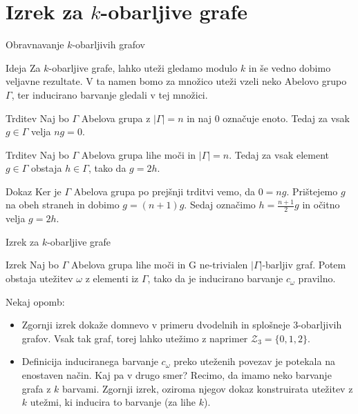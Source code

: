 \documentclass{beamer}
\begin{document}
\section{Izrek za $k$-obarljive grafe}
\begin{frame}{Obravnavanje $k$-obarljivih grafov}
	\begin{block}{Ideja}
		Za $k$-obarljive grafe, lahko uteži gledamo modulo $k$ in še vedno dobimo veljavne rezultate. V ta namen bomo za množico uteži vzeli neko Abelovo grupo $\Gamma$, ter inducirano barvanje gledali v tej množici.
	\end{block} \pause

	\begin{block}{Trditev}
		Naj bo $\Gamma$ Abelova grupa z $|\Gamma| = n$ in naj $0$ označuje enoto. Tedaj za vsak $g \in \Gamma$ velja $ng = 0$.
	\end{block}
\end{frame}

\begin{frame}
	\begin{block}{Trditev}
		Naj bo $\Gamma$ Abelova grupa lihe moči in $|\Gamma| = n$. Tedaj za vsak element $g \in \Gamma$ obstaja $h \in \Gamma$, tako da $g = 2h$.
	\end{block}
	\pause
	\begin{block}{Dokaz}
			Ker je $\Gamma$ Abelova grupa po prejšnji trditvi vemo, da $ 0 = ng$. Prištejemo $g$ na obeh straneh in dobimo $g = (n+1)g$. Sedaj označimo $h = \frac{n + 1}{2}g$ in očitno velja $g = 2h$.
	\end{block}
\end{frame}

\begin{frame}{Izrek za $k$-obarljive grafe}
	\begin{block}{Izrek}
	Naj bo $\Gamma$ Abelova grupa lihe moči in G ne-trivialen $|\Gamma|$-barljiv graf. Potem obstaja utežitev $\omega$ z elementi iz $\Gamma$, tako da je inducirano barvanje $c_{\omega}$ pravilno.
	\end{block}
	\pause
	Nekaj opomb:
	\begin{itemize}
		\item Zgornji izrek dokaže domnevo v primeru dvodelnih in splošneje $3$-obarljivih grafov. Vsak tak graf, torej lahko utežimo z naprimer $\mathcal{Z}_3 = \{0,1,2\}$. \pause
		\item Definicija induciranega barvanje $c_{\omega}$ preko uteženih povezav je potekala na enostaven način. Kaj pa v drugo smer? Recimo, da imamo neko barvanje grafa z $k$ barvami. Zgornji izrek, oziroma njegov dokaz konstruirata utežitev z $k$ utežmi, ki inducira to barvanje (za lihe $k$).
	\end{itemize}
\end{frame}
\end{document}
